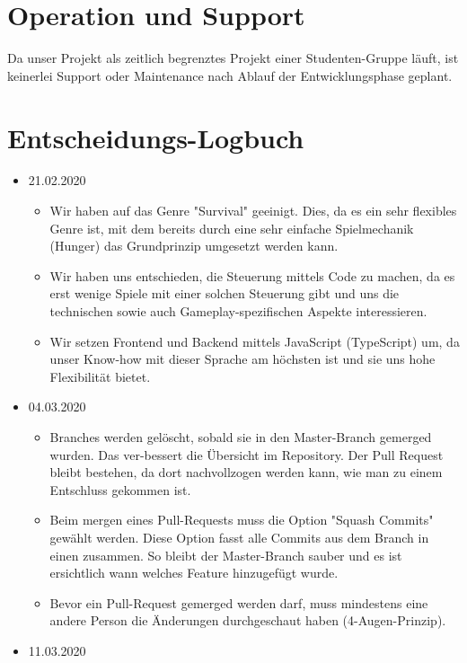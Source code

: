 \documentclass[11pt,a4paper]{scrartcl}
\let\oldsection\section
\renewcommand\section{\clearpage\oldsection}
\begin{document}
\section{Operation und Support}

Da unser Projekt als zeitlich begrenztes Projekt einer Studenten-Gruppe läuft, ist keinerlei Support oder Maintenance nach Ablauf der Entwicklungsphase geplant.

\section{Entscheidungs-Logbuch}

\begin{itemize}
  \item 21.02.2020
        \begin{itemize}
          \item Wir haben auf das Genre "Survival" geeinigt. Dies, da es ein sehr flexibles Genre ist, mit dem bereits durch eine sehr einfache Spielmechanik (Hunger) das Grundprinzip umgesetzt werden kann.
          \item Wir haben uns entschieden, die Steuerung mittels Code zu machen, da es erst wenige Spiele mit einer solchen Steuerung gibt und uns die technischen sowie auch Gameplay-spezifischen Aspekte interessieren.
          \item Wir setzen Frontend und Backend mittels JavaScript (TypeScript) um, da unser Know-how mit dieser Sprache am höchsten ist und sie uns hohe Flexibilität bietet.
        \end{itemize}
  \item 04.03.2020
        \begin{itemize}
          \item Branches werden gelöscht, sobald sie in den Master-Branch gemerged wurden. Das ver-bessert die Übersicht im Repository. Der Pull Request bleibt bestehen, da dort nachvollzogen werden kann, wie man zu einem Entschluss gekommen ist.
          \item Beim mergen eines Pull-Requests muss die Option "Squash Commits" gewählt werden. Diese Option fasst alle Commits aus dem Branch in einen zusammen. So bleibt der Master-Branch sauber und es ist ersichtlich wann welches Feature hinzugefügt wurde.
          \item Bevor ein Pull-Request gemerged werden darf, muss mindestens eine andere Person die Änderungen durchgeschaut haben (4-Augen-Prinzip).
        \end{itemize}
  \item 11.03.2020

\end{itemize}
\end{document}
